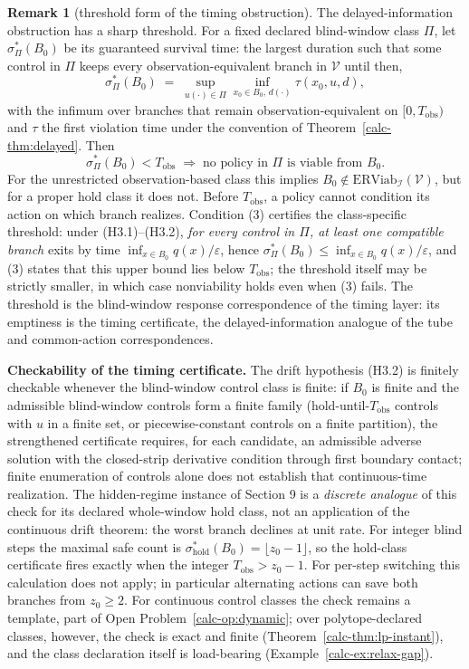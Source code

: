 \documentclass[10pt,twocolumn]{article}
\theoremstyle{definition}
\newtheorem{remark}{Remark}
\begin{document}
\begin{remark}[threshold form of the timing obstruction]\label{calc-rem:sigma}
The delayed-information obstruction has a sharp threshold. For a fixed declared blind-window class \(\Pi\), let
\(\sigma^*_{\Pi}(B_0)\) be its guaranteed survival time: the
largest duration such that some control in \(\Pi\) keeps every
observation-equivalent branch in \(\mathcal{V}\) until then,
\[\sigma^*_{\Pi}(B_0) \;=\; \sup_{u(\cdot)\in\Pi} \inf_{x_0\in B_0,\, d(\cdot)} \tau(x_0,u,d),\]
with the infimum over branches that remain observation-equivalent on
\([0,T_{\mathrm{obs}})\) and \(\tau\) the first violation time under the
convention of Theorem~\ref{calc-thm:delayed}. Then
\[\sigma^*_{\Pi}(B_0) < T_{\mathrm{obs}} \;\Longrightarrow\;
\text{no policy in }\Pi\text{ is viable from }B_0.\]
For the unrestricted observation-based class this implies
\(B_0\notin\mathrm{ERViab}_{\mathcal I}(\mathcal V)\), but for a
proper hold class it does not. Before \(T_{\mathrm{obs}}\), a policy
cannot condition its action on which branch realizes. Condition (3)
certifies the class-specific threshold: under (H3.1)--(H3.2),
\emph{for every control in \(\Pi\), at least one compatible branch}
exits by time \(\inf_{x\in B_0}q(x)/\varepsilon\), hence
\(\sigma^*_{\Pi}(B_0)\le\inf_{x\in B_0}q(x)/\varepsilon\), and (3) states that
this upper bound lies below \(T_{\mathrm{obs}}\); the threshold itself
may be strictly smaller, in which case nonviability holds even when (3)
fails. The threshold is the blind-window response correspondence of the
timing layer: its emptiness is the timing certificate, the
delayed-information analogue of the tube and common-action
correspondences.
\end{remark}

\textbf{Checkability of the timing certificate.} The drift hypothesis (H3.2) is finitely checkable whenever the blind-window control class is finite: if \(B_{0}\) is finite and the admissible blind-window controls form a finite family (hold-until-\(T_{\mathrm{obs}}\) controls with \(u\) in a finite set, or piecewise-constant controls on a finite partition), the strengthened certificate requires, for each candidate, an
admissible adverse solution with the closed-strip derivative condition
through first boundary contact; finite enumeration of controls alone
does not establish that continuous-time realization. The hidden-regime instance of Section 9 is a \emph{discrete analogue} of this check for its declared whole-window hold class, not an application of the continuous drift theorem: the worst branch declines at unit rate. For integer blind steps the maximal safe count is \(\sigma^{*}_{\mathrm{hold}}(B_0)=\lfloor z_0-1\rfloor\), so the hold-class certificate fires exactly when the integer \(T_{\mathrm{obs}}>z_0-1\). For per-step switching this calculation does not apply; in particular alternating actions can save both branches from \(z_0\ge2\). For continuous control classes the check remains a template, part of
Open Problem~\ref{calc-op:dynamic}; over polytope-declared classes, however, the
check is exact and finite (Theorem~\ref{calc-thm:lp-instant}), and the class
declaration itself is load-bearing (Example~\ref{calc-ex:relax-gap}).
\end{document}
